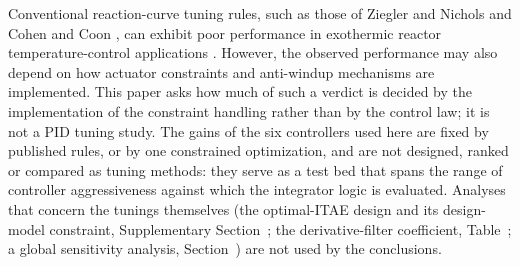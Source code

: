 Conventional reaction-curve tuning rules, such as those
of Ziegler and Nichols \cite{ziegler1942optimum}
and Cohen and Coon \cite{cohen1953theoretical},
can exhibit poor performance in exothermic reactor
temperature-control applications
\cite{visioli2006practical, luyben2007chemical}.
However, the observed performance may also depend
on how actuator constraints and anti-windup mechanisms
are implemented. This paper asks how much of such a verdict is decided by the implementation of the constraint handling rather than by the control law; it is not a PID tuning study. The gains of the six controllers used here are fixed by published rules, or by one constrained optimization, and are not designed, ranked or compared as tuning methods: they serve as a test bed that spans the range of controller aggressiveness against which the integrator logic is evaluated. Analyses that concern the tunings themselves (the optimal-ITAE design and its design-model constraint, Supplementary Section~; the derivative-filter coefficient, Table~; a global sensitivity analysis, Section~) are not used by the conclusions.

